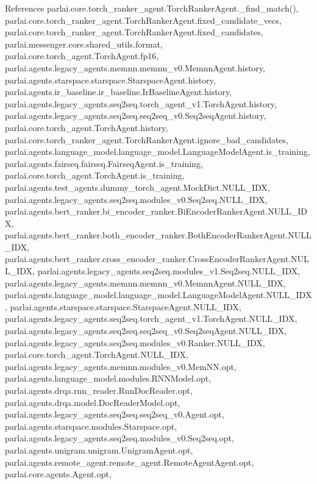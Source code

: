 References parlai.\+core.\+torch\+\_\+ranker\+\_\+agent.\+Torch\+Ranker\+Agent.\+\_\+find\+\_\+match(), parlai.\+core.\+torch\+\_\+ranker\+\_\+agent.\+Torch\+Ranker\+Agent.\+fixed\+\_\+candidate\+\_\+vecs, parlai.\+core.\+torch\+\_\+ranker\+\_\+agent.\+Torch\+Ranker\+Agent.\+fixed\+\_\+candidates, parlai.\+messenger.\+core.\+shared\+\_\+utils.\+format, parlai.\+core.\+torch\+\_\+agent.\+Torch\+Agent.\+fp16, parlai.\+agents.\+legacy\+\_\+agents.\+memnn.\+memnn\+\_\+v0.\+Memnn\+Agent.\+history, parlai.\+agents.\+starspace.\+starspace.\+Starspace\+Agent.\+history, parlai.\+agents.\+ir\+\_\+baseline.\+ir\+\_\+baseline.\+Ir\+Baseline\+Agent.\+history, parlai.\+agents.\+legacy\+\_\+agents.\+seq2seq.\+torch\+\_\+agent\+\_\+v1.\+Torch\+Agent.\+history, parlai.\+agents.\+legacy\+\_\+agents.\+seq2seq.\+seq2seq\+\_\+v0.\+Seq2seq\+Agent.\+history, parlai.\+core.\+torch\+\_\+agent.\+Torch\+Agent.\+history, parlai.\+core.\+torch\+\_\+ranker\+\_\+agent.\+Torch\+Ranker\+Agent.\+ignore\+\_\+bad\+\_\+candidates, parlai.\+agents.\+language\+\_\+model.\+language\+\_\+model.\+Language\+Model\+Agent.\+is\+\_\+training, parlai.\+agents.\+fairseq.\+fairseq.\+Fairseq\+Agent.\+is\+\_\+training, parlai.\+core.\+torch\+\_\+agent.\+Torch\+Agent.\+is\+\_\+training, parlai.\+agents.\+test\+\_\+agents.\+dummy\+\_\+torch\+\_\+agent.\+Mock\+Dict.\+N\+U\+L\+L\+\_\+\+I\+DX, parlai.\+agents.\+legacy\+\_\+agents.\+seq2seq.\+modules\+\_\+v0.\+Seq2seq.\+N\+U\+L\+L\+\_\+\+I\+DX, parlai.\+agents.\+bert\+\_\+ranker.\+bi\+\_\+encoder\+\_\+ranker.\+Bi\+Encoder\+Ranker\+Agent.\+N\+U\+L\+L\+\_\+\+I\+DX, parlai.\+agents.\+bert\+\_\+ranker.\+both\+\_\+encoder\+\_\+ranker.\+Both\+Encoder\+Ranker\+Agent.\+N\+U\+L\+L\+\_\+\+I\+DX, parlai.\+agents.\+bert\+\_\+ranker.\+cross\+\_\+encoder\+\_\+ranker.\+Cross\+Encoder\+Ranker\+Agent.\+N\+U\+L\+L\+\_\+\+I\+DX, parlai.\+agents.\+legacy\+\_\+agents.\+seq2seq.\+modules\+\_\+v1.\+Seq2seq.\+N\+U\+L\+L\+\_\+\+I\+DX, parlai.\+agents.\+legacy\+\_\+agents.\+memnn.\+memnn\+\_\+v0.\+Memnn\+Agent.\+N\+U\+L\+L\+\_\+\+I\+DX, parlai.\+agents.\+language\+\_\+model.\+language\+\_\+model.\+Language\+Model\+Agent.\+N\+U\+L\+L\+\_\+\+I\+DX, parlai.\+agents.\+starspace.\+starspace.\+Starspace\+Agent.\+N\+U\+L\+L\+\_\+\+I\+DX, parlai.\+agents.\+legacy\+\_\+agents.\+seq2seq.\+torch\+\_\+agent\+\_\+v1.\+Torch\+Agent.\+N\+U\+L\+L\+\_\+\+I\+DX, parlai.\+agents.\+legacy\+\_\+agents.\+seq2seq.\+seq2seq\+\_\+v0.\+Seq2seq\+Agent.\+N\+U\+L\+L\+\_\+\+I\+DX, parlai.\+agents.\+legacy\+\_\+agents.\+seq2seq.\+modules\+\_\+v0.\+Ranker.\+N\+U\+L\+L\+\_\+\+I\+DX, parlai.\+core.\+torch\+\_\+agent.\+Torch\+Agent.\+N\+U\+L\+L\+\_\+\+I\+DX, parlai.\+agents.\+legacy\+\_\+agents.\+memnn.\+modules\+\_\+v0.\+Mem\+N\+N.\+opt, parlai.\+agents.\+language\+\_\+model.\+modules.\+R\+N\+N\+Model.\+opt, parlai.\+agents.\+drqa.\+rnn\+\_\+reader.\+Rnn\+Doc\+Reader.\+opt, parlai.\+agents.\+drqa.\+model.\+Doc\+Reader\+Model.\+opt, parlai.\+agents.\+legacy\+\_\+agents.\+seq2seq.\+seq2seq\+\_\+v0.\+Agent.\+opt, parlai.\+agents.\+starspace.\+modules.\+Starspace.\+opt, parlai.\+agents.\+legacy\+\_\+agents.\+seq2seq.\+modules\+\_\+v0.\+Seq2seq.\+opt, parlai.\+agents.\+unigram.\+unigram.\+Unigram\+Agent.\+opt, parlai.\+agents.\+remote\+\_\+agent.\+remote\+\_\+agent.\+Remote\+Agent\+Agent.\+opt, parlai.\+core.\+agents.\+Agent.\+opt, 